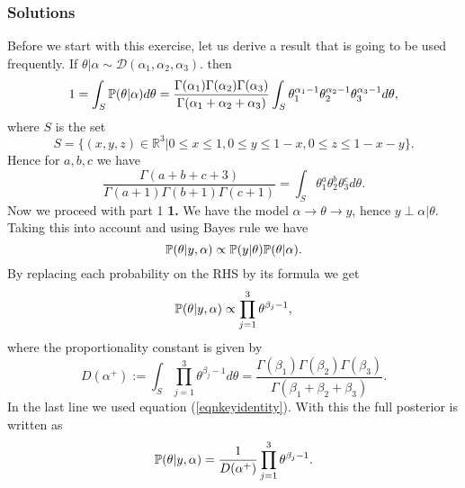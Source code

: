 \documentclass{article}
\begin{document}
\subsubsection*{Solutions}
Before we start with this exercise, let us derive a result that is going to be used frequently. If $\theta|\alpha\sim\mathcal{D}(\alpha_{1},\alpha_{2},\alpha_{3})$.
then
\begin{equation*}
1=\int_{S}\mathbb{P}(\theta|\alpha)d\theta=\frac{\Gamma(\alpha_1)\Gamma(\alpha_2)\Gamma(\alpha_3)}{\Gamma(\alpha_1+\alpha_2+\alpha_3)}\int_{S}\theta_1^{\alpha_1-1}
\theta_2^{\alpha_2-1}\theta_3^{\alpha_3-1}d\theta,
\end{equation*}
where $S$ is the set
\begin{equation*}
S=\{(x,y,z)\in\mathbb{R}^{3}|0\leq x\leq 1,0\leq y\leq 1-x,0\leq z\leq 1-x-y\}.
\end{equation*}
Hence for $a,b,c$ we have
\begin{equation}\label{eqnkeyidentity}
\frac{\Gamma(a+b+c+3)}{\Gamma(a+1)\Gamma(b+1)\Gamma(c+1)}=\int_{S}\theta_1^{a}
\theta_2^{b}\theta_3^{c}d\theta.
\end{equation}
Now we proceed with part 1
\newline
\newline
\textbf{1.}
\newline
We have the model $\alpha\rightarrow\theta\rightarrow y$, hence $y\perp\alpha |\theta$.  Taking this into account and using Bayes rule we have
\begin{equation*}
\mathbb{P}(\theta|y,\alpha)\propto\mathbb{P}(y|\theta)\mathbb{P}(\theta|\alpha).
\end{equation*}
By replacing each probability on the RHS by its formula we get
\begin{equation*}
\mathbb{P}(\theta|y,\alpha)\propto\prod_{j=1}^{3}\theta^{\beta_{j}-1},
\end{equation*}
where the proportionality constant is given by 
\begin{equation*}
D(\alpha^{+}):=\int_{S}\prod_{j=1}^{3}\theta^{\beta_{j}-1}d\theta=\frac{\Gamma(\beta_1)\Gamma(\beta_2)\Gamma(\beta_3)}{\Gamma(\beta_1+\beta_2+\beta_3)}.
\end{equation*}
In the last line we used equation (\ref{eqnkeyidentity}). With this the full posterior is written as
\begin{equation}\label{eqnfullposterior}
\mathbb{P}(\theta|y,\alpha)=\frac{1}{D(\alpha^{+})}\prod_{j=1}^{3}\theta^{\beta_{j}-1}.
\end{equation}
\newline
\newline
\end{document}
